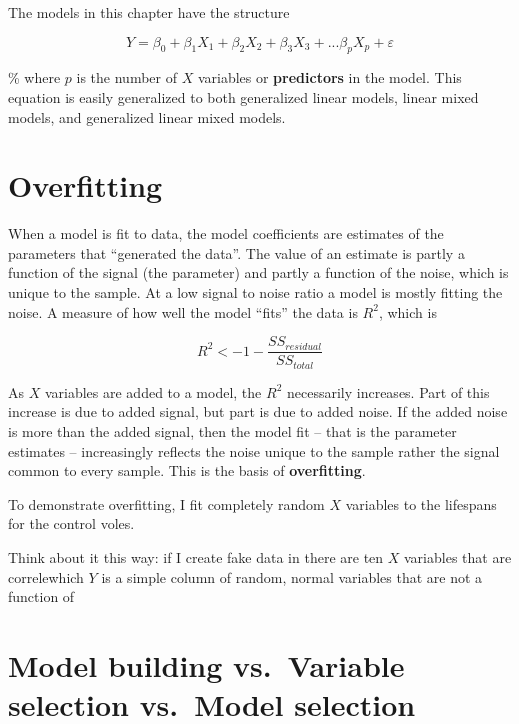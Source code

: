 \documentclass[]{book}
\begin{document}
The models in this chapter have the structure

\begin{equation}
Y = \beta_0 + \beta_1 X_1 + \beta_2 X_2 + \beta_3 X_3 + ... \beta_p X_p + \varepsilon 
\end{equation}

\% where \(p\) is the number of \(X\) variables or \textbf{predictors}
in the model. This equation is easily generalized to both generalized
linear models, linear mixed models, and generalized linear mixed models.

\section{Overfitting}\label{overfitting}

When a model is fit to data, the model coefficients are estimates of the
parameters that ``generated the data''. The value of an estimate is
partly a function of the signal (the parameter) and partly a function of
the noise, which is unique to the sample. At a low signal to noise ratio
a model is mostly fitting the noise. A measure of how well the model
``fits'' the data is \(R^2\), which is

\begin{equation}
R^2 <- 1 - \frac{SS_{residual}}{SS_{total}}
\end{equation}

As \(X\) variables are added to a model, the \(R^2\) necessarily
increases. Part of this increase is due to added signal, but part is due
to added noise. If the added noise is more than the added signal, then
the model fit -- that is the parameter estimates -- increasingly
reflects the noise unique to the sample rather the signal common to
every sample. This is the basis of \textbf{overfitting}.

To demonstrate overfitting, I fit completely random \(X\) variables to
the lifespans for the control voles.

Think about it this way: if I create fake data in there are ten \(X\)
variables that are correlewhich \(Y\) is a simple column of random,
normal variables that are not a function of

\section{Model building vs.~Variable selection vs.~Model
selection}\label{model-building-vs.variable-selection-vs.model-selection}
\end{document}
